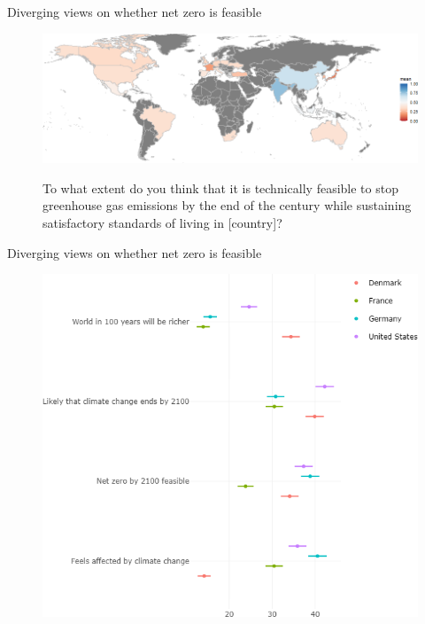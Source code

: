 \begin{frame}{Diverging views on whether net zero is feasible}%
	\begin{figure}[h!]
	\centering
	\caption{To what extent do you think that it is technically feasible to stop greenhouse gas emissions by the end of the century while sustaining satisfactory standards of living in [country]?}
	\includegraphics[width=\textwidth]{../figures/maps/net_zero_feasible_cont.png} \\
	\end{figure}
\end{frame}

\begin{frame}{Diverging views on whether net zero is feasible}%
	\begin{figure}[h!]
	\centering
	\includegraphics[height=.8\textheight]{../figures/country_comparison/future_by_country.png} \\
	\end{figure}
\end{frame}

